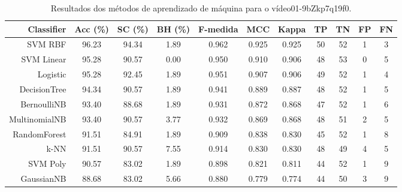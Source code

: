 \begin{table}[!htb]
\centering
\caption{Resultados dos métodos de aprendizado de máquina para o vídeo01-9bZkp7q19f0.}
\label{tab:01-9bZkp7q19f0}
\begin{tabular}{r|c|c|c|c|c|c|c|c|c|c}
\hline\hline
Classifier & Acc (\%) & SC (\%) & BH (\%) & F-medida & MCC & Kappa & TP & TN & FP & FN \\ \hline
SVM RBF & 96.23 & 94.34 & 1.89 & 0.962 & 0.925 & 0.925 & 50 & 52 & 1 & 3 \\ 
SVM Linear & 95.28 & 90.57 & 0.00 & 0.950 & 0.910 & 0.906 & 48 & 53 & 0 & 5 \\ 
Logistic & 95.28 & 92.45 & 1.89 & 0.951 & 0.907 & 0.906 & 49 & 52 & 1 & 4 \\ 
DecisionTree & 94.34 & 90.57 & 1.89 & 0.941 & 0.889 & 0.887 & 48 & 52 & 1 & 5 \\ 
BernoulliNB & 93.40 & 88.68 & 1.89 & 0.931 & 0.872 & 0.868 & 47 & 52 & 1 & 6 \\ 
MultinomialNB & 93.40 & 90.57 & 3.77 & 0.932 & 0.869 & 0.868 & 48 & 51 & 2 & 5 \\ 
RandomForest & 91.51 & 84.91 & 1.89 & 0.909 & 0.838 & 0.830 & 45 & 52 & 1 & 8 \\ 
k-NN & 91.51 & 90.57 & 7.55 & 0.914 & 0.830 & 0.830 & 48 & 49 & 4 & 5 \\ 
SVM Poly & 90.57 & 83.02 & 1.89 & 0.898 & 0.821 & 0.811 & 44 & 52 & 1 & 9 \\ 
GaussianNB & 88.68 & 83.02 & 5.66 & 0.880 & 0.779 & 0.774 & 44 & 50 & 3 & 9 \\ 
\hline\hline
\end{tabular}
\end{table}
